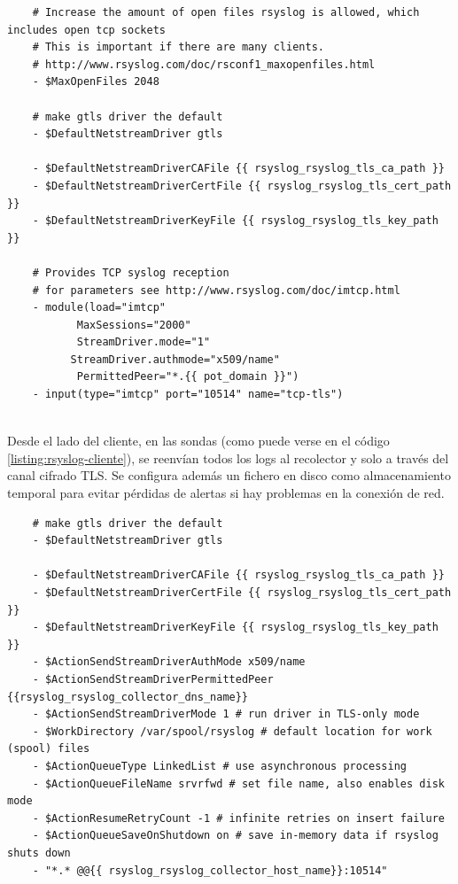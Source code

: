 \begin{verbatim}
    # Increase the amount of open files rsyslog is allowed, which includes open tcp sockets
    # This is important if there are many clients.
    # http://www.rsyslog.com/doc/rsconf1_maxopenfiles.html
    - $MaxOpenFiles 2048

    # make gtls driver the default
    - $DefaultNetstreamDriver gtls

    - $DefaultNetstreamDriverCAFile {{ rsyslog_rsyslog_tls_ca_path }}
    - $DefaultNetstreamDriverCertFile {{ rsyslog_rsyslog_tls_cert_path }}
    - $DefaultNetstreamDriverKeyFile {{ rsyslog_rsyslog_tls_key_path }}

    # Provides TCP syslog reception
    # for parameters see http://www.rsyslog.com/doc/imtcp.html
    - module(load="imtcp"
           MaxSessions="2000"
           StreamDriver.mode="1"
          StreamDriver.authmode="x509/name"
           PermittedPeer="*.{{ pot_domain }}")
    - input(type="imtcp" port="10514" name="tcp-tls")
         
\end{verbatim}
\bigskip

Desde el lado del cliente, en las sondas (como puede verse en el código \ref{listing:rsyslog-cliente}), se reenvían todos los logs
al recolector y solo a través del canal cifrado TLS. Se configura además un fichero en disco como almacenamiento temporal
para evitar pérdidas de alertas si hay problemas en la conexión de red.

\begin{verbatim}
    # make gtls driver the default
    - $DefaultNetstreamDriver gtls
    
    - $DefaultNetstreamDriverCAFile {{ rsyslog_rsyslog_tls_ca_path }}
    - $DefaultNetstreamDriverCertFile {{ rsyslog_rsyslog_tls_cert_path }}
    - $DefaultNetstreamDriverKeyFile {{ rsyslog_rsyslog_tls_key_path }}
    - $ActionSendStreamDriverAuthMode x509/name
    - $ActionSendStreamDriverPermittedPeer {{rsyslog_rsyslog_collector_dns_name}}
    - $ActionSendStreamDriverMode 1 # run driver in TLS-only mode
    - $WorkDirectory /var/spool/rsyslog # default location for work (spool) files
    - $ActionQueueType LinkedList # use asynchronous processing
    - $ActionQueueFileName srvrfwd # set file name, also enables disk mode
    - $ActionResumeRetryCount -1 # infinite retries on insert failure
    - $ActionQueueSaveOnShutdown on # save in-memory data if rsyslog shuts down
    - "*.* @@{{ rsyslog_rsyslog_collector_host_name}}:10514"         
\end{verbatim}
\bigskip

